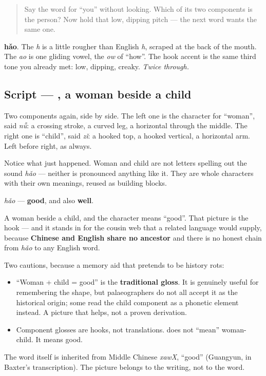\begin{quote}
Say the word for \textquotedblleft{}you\textquotedblright{} without looking. Which of its two components is the person? Now hold that low, dipping pitch — the next word wants the same one.
\end{quote}

\begin{sounds}
\textbf{hǎo}. The \emph{h} is a little rougher than English \emph{h}, scraped at the back of the mouth. The \emph{ao} is one gliding vowel, the \emph{ow} of \textquotedblleft{}how\textquotedblright{}. The hook accent is the same third tone you already met: low, dipping, creaky. \emph{Twice through.}
\end{sounds}

\subsection*{Script — , a woman beside a child}
Two components again, side by side. The left one is the character for \textquotedblleft{}woman\textquotedblright{}, said \emph{nǚ}: a crossing stroke, a curved leg, a horizontal through the middle. The right one is \textquotedblleft{}child\textquotedblright{}, said \emph{zǐ}: a hooked top, a hooked vertical, a horizontal arm. Left before right, as always.

Notice what just happened. Woman and child are not letters spelling out the sound \emph{hǎo} — neither is pronounced anything like it. They are whole characters with their own meanings, reused as building blocks.

\begin{cousinweb}
\textbf{} \emph{hǎo} — \textbf{good}, and also \textbf{well}.

A woman beside a child, and the character means \textquotedblleft{}good\textquotedblright{}. That picture is the hook — and it stands in for the cousin web that a related language would supply, because \textbf{Chinese and English share no ancestor} and there is no honest chain from \emph{hǎo} to any English word.

Two cautions, because a memory aid that pretends to be history rots:

\begin{itemize}
\raggedright
  \item \textquotedblleft{}Woman + child = good\textquotedblright{} is the \textbf{traditional gloss}. It is genuinely useful for remembering the shape, but palaeographers do not all accept it as the historical origin; some read the child component as a phonetic element instead. A picture that helps, not a proven derivation.
  \item Component glosses are hooks, not translations. \textbf{} does not \textquotedblleft{}mean\textquotedblright{} woman-child. It means good.
\end{itemize}

The word itself is inherited from Middle Chinese \emph{xawX}, \textquotedblleft{}good\textquotedblright{} (Guangyun, in Baxter's transcription). The picture belongs to the writing, not to the word.
\end{cousinweb}

